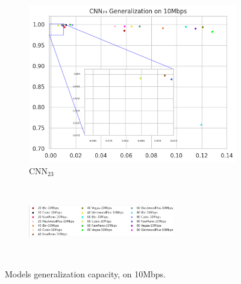 \documentclass[a4paper,fleqn]{cas-sc}
\begin{document}
\begin{figure}[h!]
\begin{minipage}[t]{0.46\textwidth}
\begin{subfigure}[t]{0.33\textwidth}
				\includegraphics[draft=false, width=\textwidth]{./figs/Generalizacao-CNN23-10Mbps.png} 
				\caption{CNN$_{23}$}
				\label{fig:Generalizacao-CNN23-10Mbps}
			\end{subfigure}%
			~

			\begin{subfigure}[t]{\textwidth}
			\centering
			\includegraphics[draft=false, width=0.7\textwidth]{./figs/legenta_10Mbps.png} 
			\label{fig:legenda-10Mbps}
			\end{subfigure}%
			~
		\hfill
		\caption{Models generalization capacity, on 10Mbps.\hspace{8.5cm}}
		\label{fig:fig:Generalizacao-10Mbps}
		

\end{minipage}
\end{figure}
\end{document}
